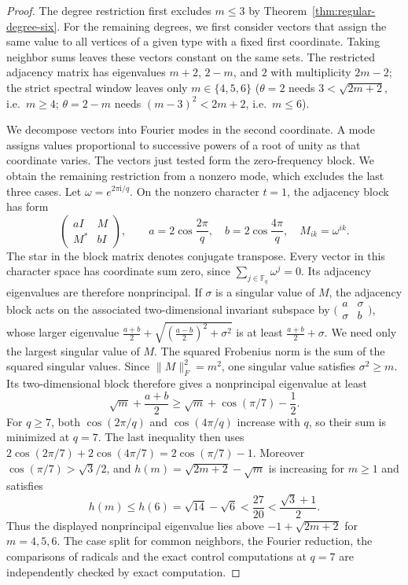 \documentclass[a4paper,10pt,reqno]{amsart}
\theoremstyle{plain}
\theoremstyle{definition}
\theoremstyle{remark}
\begin{document}
\begin{proof}
The degree restriction first excludes \(m\le3\) by
Theorem~\ref{thm:regular-degree-six}.  For the remaining degrees, we first
consider vectors that assign the same value to all vertices of a given
type with a fixed first coordinate.  Taking neighbor sums leaves these
vectors constant on the same sets.  The restricted adjacency matrix has
eigenvalues \(m+2\), \(2-m\), and \(2\) with multiplicity \(2m-2\);
the strict spectral window leaves only \(m\in\{4,5,6\}\)
(\(\theta=2\) needs \(3<\sqrt{2m+2}\), i.e.\ \(m\ge4\); \(\theta=2-m\) needs
\((m-3)^2<2m+2\), i.e.\ \(m\le6\)).

We decompose vectors into Fourier modes in the second coordinate. A mode
assigns values proportional to successive powers of a root of unity as that
coordinate varies. The vectors just tested form the zero-frequency block.
We obtain the remaining restriction from a nonzero mode, which excludes the
last three cases.
Let \(\omega=e^{2\pi\mathrm i/q}\).  On the nonzero
character \(t=1\), the adjacency block has form
\[
 \begin{pmatrix}aI&M\\M^*&bI\end{pmatrix},
 \qquad a=2\cos\frac{2\pi}{q},
 \quad b=2\cos\frac{4\pi}{q},
 \quad M_{ik}=\omega^{ik}.
\]
The star in the block matrix denotes conjugate transpose. Every vector
in this character space has coordinate sum zero, since
\(\sum_{j\in\mathbb F_q}\omega^j=0\). Its adjacency eigenvalues are
therefore nonprincipal.
If \(\sigma\) is a singular value of \(M\), the adjacency block acts on the
associated two-dimensional invariant subspace by
\(\bigl(\begin{smallmatrix}a&\sigma\\\sigma&b\end{smallmatrix}\bigr)\),
whose larger eigenvalue
\(\frac{a+b}2+\sqrt{(\frac{a-b}2)^2+\sigma^2}\) is at least
\(\frac{a+b}2+\sigma\).
We need only the largest singular value of \(M\). The squared Frobenius norm is the sum of the squared singular
values. Since \(\|M\|_F^2=m^2\), one singular value satisfies
\(\sigma^2\ge m\).  Its two-dimensional block therefore gives a
nonprincipal eigenvalue at least
\[
 \sqrt m+\frac{a+b}{2}
 \ge \sqrt m+\cos(\pi/7)-\frac12.
\]
For \(q\ge7\), both \(\cos(2\pi/q)\) and \(\cos(4\pi/q)\) increase with
\(q\), so their sum is minimized at \(q=7\).  The last inequality then uses
\(2\cos(2\pi/7)+2\cos(4\pi/7)=2\cos(\pi/7)-1\).
Moreover \(\cos(\pi/7)>\sqrt3/2\), and
\(h(m)=\sqrt{2m+2}-\sqrt m\) is increasing for \(m\ge1\) and satisfies
\[
 h(m)\le h(6)=\sqrt{14}-\sqrt6
 <\frac{27}{20}<\frac{\sqrt3+1}{2}.
\]
Thus the displayed nonprincipal eigenvalue lies above
\(-1+\sqrt{2m+2}\) for \(m=4,5,6\).  The case split for common neighbors,
the Fourier reduction, the comparisons of radicals and the exact control
computations at \(q=7\) are independently checked by exact computation.
\end{proof}
\end{document}
